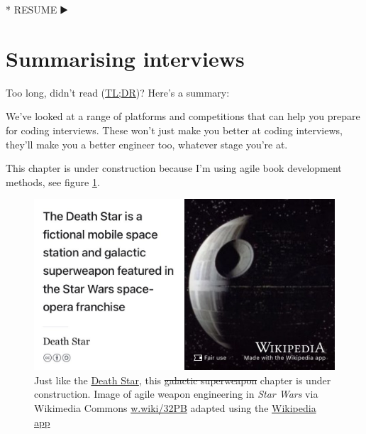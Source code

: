 \documentclass[
]{book}
\newenvironment{Shaded}{\begin{snugshade}}{\end{snugshade}}
\newcommand{\NormalTok}[1]{#1}
\newcommand{\SpecialStringTok}[1]{\textcolor[rgb]{0.31,0.60,0.02}{#1}}
\begin{document}
\begin{Shaded}
\begin{Highlighting}[]
\SpecialStringTok{* }\NormalTok{RESUME ▶️}
\end{Highlighting}
\end{Shaded}

\hypertarget{tldr9}{%
\section{Summarising interviews}\label{tldr9}}

Too long, didn't read (\href{https://en.wiktionary.org/wiki/too_long;_didn\%27t_read}{TL;DR})? Here's a summary:

We've looked at a range of platforms and competitions that can help you prepare for coding interviews. These won't just make you better at coding interviews, they'll make you a better engineer too, whatever stage you're at.

This chapter is under construction because I'm using agile book development methods, see figure \ref{fig:deathstar6-fig}.

\begin{figure}

{\centering \includegraphics[width=0.99\linewidth]{images/DeathStar2} 

}

\caption{Just like the \href{https://en.wikipedia.org/wiki/Death_Star}{Death Star}, this \sout{galactic superweapon} chapter is under construction. Image of agile weapon engineering in \emph{Star Wars} via Wikimedia Commons \href{https://w.wiki/32PB}{w.wiki/32PB} adapted using the \href{https://apps.apple.com/gb/app/wikipedia/id324715238}{Wikipedia app}}\label{fig:deathstar6-fig}
\end{figure}
\end{document}
